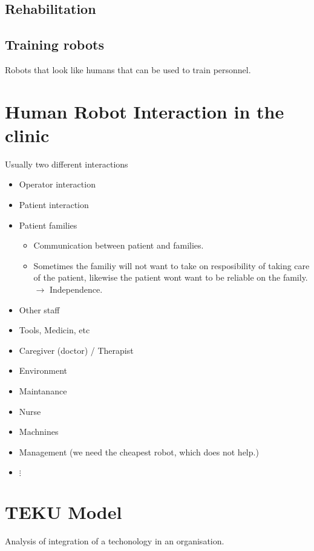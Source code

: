 \documentclass[a4paper]{article}
\begin{document}
\subsection{Rehabilitation}


\subsection{Training robots}
Robots that look like humans that can be used to train personnel.

\section{Human Robot Interaction in the clinic}
Usually two different interactions
\begin{itemize}
	\item Operator interaction
	\item Patient interaction
	\item Patient families
		\begin{itemize}
			\item Communication between patient and families. 
			\item Sometimes the familiy will not want to take on resposibility of taking care of the patient, likewise the patient wont want to be reliable on the family. $ \rightarrow $ Independence. 
		\end{itemize}
	\item Other staff
	\item Tools, Medicin, etc 
	\item Caregiver (doctor) / Therapist
	\item Environment
	\item Maintanance
	\item Nurse
	\item Machnines
	\item Management (we need the cheapest robot, which does not help.)
	\item  $ \vdots $
\end{itemize}


\section{TEKU Model}
Analysis of integration of a techonology in an organisation.
\end{document}
